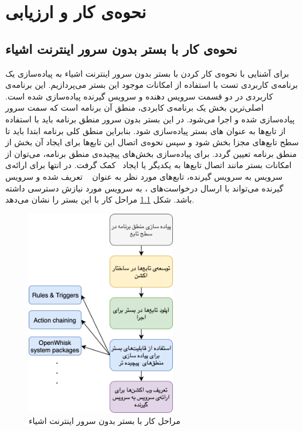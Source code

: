 \chapter{نحوه‌ی کار و ارزیابی}\label{chapter4}

\section{نحوه‌ی کار با بستر بدون سرور اینترنت اشیاء}

برای آشنایی با نحوه‌ی کار کردن با بستر بدون سرور اینترنت اشیاء به پیاده‌سازی یک برنامه‌ی کاربردی تست با استفاده از امکانات موجود این بستر می‌پردازیم. این برنامه‌‌ی کاربردی در دو قسمت سرویس دهنده و سرویس گیرنده پیاده‌سازی شده است. اصلی‌ترین بخش یک برنامه‌ی کابردی، منطق آن برنامه است که سمت سرور پیاده‌سازی شده و اجرا می‌شود. در این بستر بدون سرور منطق برنامه باید با استفاده از تابع‌ها به عنوان  های بستر  پیاده‌سازی شود. بنابراین منطق کلی برنامه ابتدا باید تا سطح تابع‌های مجزا بخش شود و سپس نحوه‌ی اتصال این تابع‌ها برای ایجاد آن بخش از منطق برنامه تعیین گردد. برای پیاده‌سازی بخش‌های پیچیده‌ی منطق برنامه، می‌توان از امکانات بستر  مانند اتصال تابع‌ها به یکدیگر یا ایجاد  کمک گرفت. در انتها برای ارائه‌ی سرویس به سرویس گیرنده، تابع‌های مورد نظر به عنوان   تعریف شده و سرویس گیرنده می‌تواند با ارسال درخواست‌های ، به سرویس مورد نیازش دسترسی داشته باشد. شکل \ref{tok-work-flow} مراحل کار با این بستر را نشان می‌دهد.

\begin{figure}[!h]
	\centering
	\includegraphics[height=9cm]{images/tok-work-flow}
	\caption{مراحل کار با بستر بدون سرور اینترنت اشیاء}
	\label{tok-work-flow}
\end{figure}

